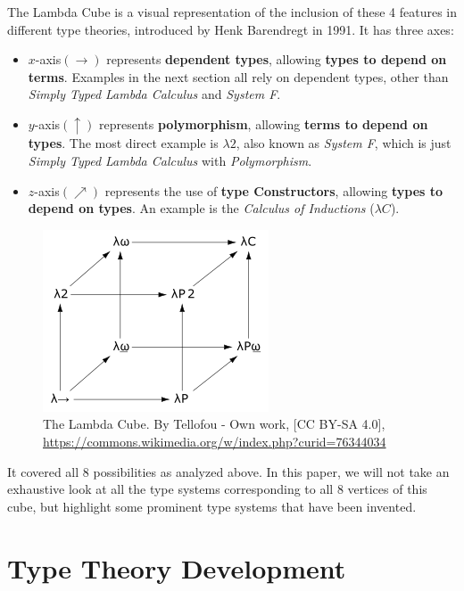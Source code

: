 \documentclass[acmsmall]{acmart}
\begin{document}
The Lambda Cube is a visual representation of the inclusion of these 4 features
in different type theories, introduced by Henk Barendregt\cite{barendregt_1991}
in 1991. It has three axes:
\begin{itemize}
  \item $x$-axis$(\rightarrow)$ represents \textbf{dependent types}, allowing
        \textbf{types to depend on terms}. Examples in the next section all rely
        on dependent types, other than \emph{Simply Typed Lambda Calculus} and
        \emph{System F}.
  \item $y$-axis$(\uparrow)$ represents \textbf{polymorphism}, allowing \textbf{terms
        to depend on types}. The most direct example is $\lambda2$, also known as
        \emph{System F}, which is just \emph{Simply Typed Lambda Calculus} with
        \emph{Polymorphism}.
  \item $z$-axis$(\nearrow)$ represents the use of \textbf{type Constructors}, allowing
        \textbf{types to depend on types}. An example is the \emph{Calculus of
        Inductions} ($\lambda C$).
\end{itemize}

\begin{figure}[H]
  \centering
  \caption{The Lambda Cube. By Tellofou - Own work, [CC BY-SA 4.0],
    \url{https://commons.wikimedia.org/w/index.php?curid=76344034}}
  \label{fig:cube}
  \includegraphics[scale=0.5]{lambda_cube}
\end{figure}

It covered all $8$ possibilities as analyzed above. In this paper, we will not
take an exhaustive look at all the type systems corresponding to all $8$
vertices of this cube, but highlight some prominent type systems that have been
invented.

\section{Type Theory Development}\label{sec:history}
\end{document}
